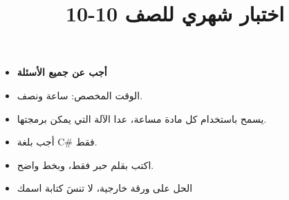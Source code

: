 ﻿\documentclass[14pt]{extarticle}
\title{اختبار شهري للصف 10-10}
\begin{document}
\maketitle

\ifwithsols
\else
\begin{boxCode}
    \begin{itemize}[nosep]
        \item \textbf{أجب عن جميع الأسئلة}
        \item الوقت المخصص: ساعة ونصف.
        \item يسمح باستخدام كل مادة مساعة، عدا الآلة التي يمكن برمجتها.
        \item أجب بلغة \textenglish{C\#} فقط.
        \item اكتب بقلم حبر فقط، وبخط واضح.
        \item الحل على ورقة خارجية، لا تنسَ كتابة اسمك
    \end{itemize}
\end{boxCode}
\fi

\vspace{1cm}
\end{document}
